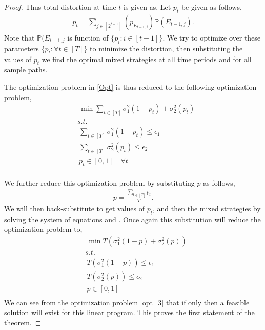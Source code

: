 \documentclass[a4paper,english,12pt]{article}
\begin{document}
\begin{proof}
    Thus total distortion at time $t$ is given as,
Let $p_t$ be given as follows,
\begin{align}\label{soe1}
p_t=\sum_{ j \in [2^{t-1}]} (p_{E_{t-1,j}})\mathbb{P}(E_{t-1,j}).
\end{align} Note that $\mathbb{P}(E_{t-1,j}$ is function of $\{p_i: i \in [t-1]\}$. We try to optimize over these parameters $\{p_t: \forall t \in [T]\}$ to minimize the distortion, then substituting the values of $p_t$ we find the optimal mixed strategies at all time periods and for all sample paths.

The optimization problem in \ref{Opt} is thus reduced to the following optimization problem,
\begin{align}
& \ \min \sum_{ t \in [T]} \sigma_1^2(1-p_t)+\sigma_2^2(p_t)\\
& s.t. \nonumber\\
 &\ \sum_{t \in [T]} \sigma_1^2(1-p_t) \leq \epsilon_1  \nonumber\\
&\ \sum_{t \in [T]} \sigma_2^2(p_t) \leq \epsilon_2  \nonumber\\
&\ p_t \in [0,1] \quad \forall t \nonumber\\
\nonumber
\end{align}
 
 We further reduce this optimization problem by substituting $p$ as follows,
 \begin{align}\label{soe2}
 p=\frac{\sum_{ t \in [T]}p_t}{T}.
 \end{align} 
 We will then back-substitute to get values of $p_t$, and then the mixed strategies by solving the system of equations and .
 Once again this substitution  will reduce the optimization problem to,
 \begin{align}\label{opt_3}
& \ \min T(\sigma_1^2(1-p)+\sigma_2^2(p))\\
& s.t. \nonumber\\
 &\ T( \sigma_1^2(1-p) )\leq \epsilon_1  \nonumber\\
&\ T( \sigma_2^2(p)) \leq \epsilon_2  \nonumber\\
&\ p \in [0,1] \nonumber\\
\nonumber
\end{align}
 We can see from the optimization problem \ref{opt_3} that if
   only then a feasible solution will exist for this linear program. This proves the first statement of the theorem.
  

\end{proof}
\end{document}
